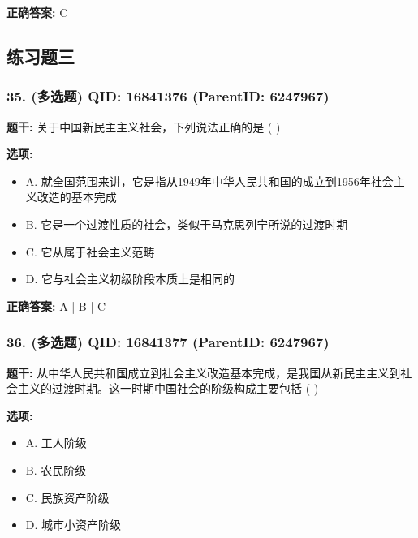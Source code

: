 \documentclass[12pt,UTF8]{ctexart}
\begin{document}
\textbf{正确答案:}
C

\vspace{0.3em}\hrulefill\vspace{0.7em}

\subsection*{练习题三}

\subsubsection*{35. (多选题) \small QID: 16841376 (ParentID: 6247967)}

\textbf{题干:}
关于中国新民主主义社会，下列说法正确的是 ( )



\textbf{选项:}
\begin{itemize}[leftmargin=*]

  \item A. 就全国范围来讲，它是指从1949年中华人民共和国的成立到1956年社会主义改造的基本完成

  \item B. 它是一个过渡性质的社会，类似于马克思列宁所说的过渡时期

  \item C. 它从属于社会主义范畴

  \item D. 它与社会主义初级阶段本质上是相同的

\end{itemize}

\textbf{正确答案:}
A | B | C

\vspace{0.3em}\hrulefill\vspace{0.7em}

\subsubsection*{36. (多选题) \small QID: 16841377 (ParentID: 6247967)}

\textbf{题干:}
从中华人民共和国成立到社会主义改造基本完成，是我国从新民主主义到社会主义的过渡时期。这一时期中国社会的阶级构成主要包括 ( )



\textbf{选项:}
\begin{itemize}[leftmargin=*]

  \item A. 工人阶级

  \item B. 农民阶级

  \item C. 民族资产阶级

  \item D. 城市小资产阶级

\end{itemize}
\end{document}
